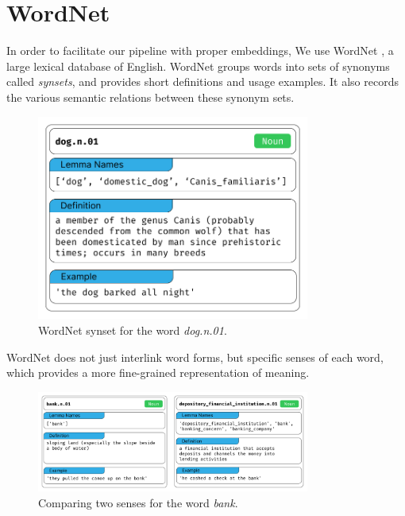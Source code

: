 \section{WordNet}
In order to facilitate our pipeline with proper embeddings, We use WordNet \cite{millerWordNetLexicalDatabase1994}, a large lexical database of English.
WordNet groups words into sets of synonyms called \textit{synsets}, and provides short definitions and usage examples. It also records the
various semantic relations between these synonym sets.

\begin{figure}
    \centering
    \includegraphics[width=0.8\textwidth]{figures/wordnet_single_synset.png}
    \caption{WordNet synset for the word \textit{dog.n.01}.}
    \label{fig:wordnet_single_synset}
\end{figure}

WordNet does not just interlink word forms, but specific senses of each word, which provides a more fine-grained representation of meaning.

\begin{figure}
    \centering
    \includegraphics[width=0.8\textwidth]{figures/wordnet_multiple_synset.png}
    \caption{Comparing two senses for the word \textit{bank}.}
    \label{fig:wordnet_multiple_synset}
\end{figure}



